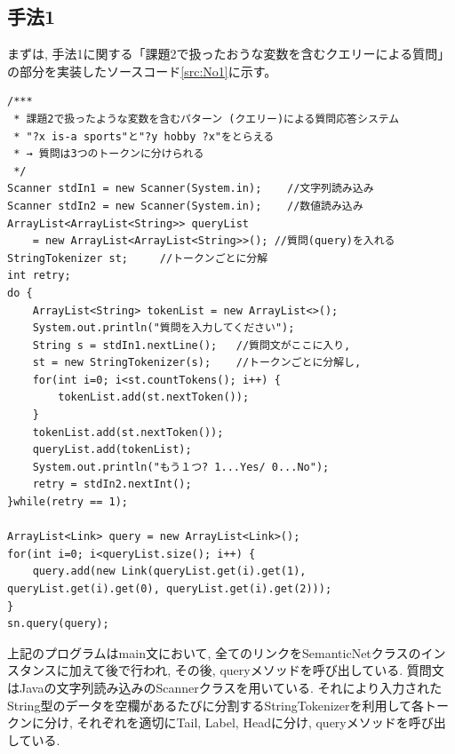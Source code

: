 \documentclass[uplatex,12pt]{jsarticle}
\begin{document}
\subsection{手法1}
まずは, 手法1に関する「課題2で扱ったおうな変数を含むクエリーによる質問」の部分を実装したソースコード\ref{src:No1}に示す。
\begin{lstlisting}[caption=クエリーの形に添った質問応答, label=src:No1]
/***
 * 課題2で扱ったような変数を含むパターン (クエリー)による質問応答システム
 * "?x is-a sports"と"?y hobby ?x"をとらえる
 * → 質問は3つのトークンに分けられる
 */
Scanner stdIn1 = new Scanner(System.in);	//文字列読み込み
Scanner stdIn2 = new Scanner(System.in);	//数値読み込み
ArrayList<ArrayList<String>> queryList 
    = new ArrayList<ArrayList<String>>(); //質問(query)を入れる
StringTokenizer st;		//トークンごとに分解
int retry;
do {
	ArrayList<String> tokenList = new ArrayList<>();
	System.out.println("質問を入力してください");
	String s = stdIn1.nextLine(); 	//質問文がここに入り,
	st = new StringTokenizer(s);	//トークンごとに分解し,
	for(int i=0; i<st.countTokens(); i++) {
		tokenList.add(st.nextToken());
	}
	tokenList.add(st.nextToken());
	queryList.add(tokenList);
	System.out.println("もう１つ? 1...Yes/ 0...No");
	retry = stdIn2.nextInt();
}while(retry == 1);

ArrayList<Link> query = new ArrayList<Link>();
for(int i=0; i<queryList.size(); i++) {
	query.add(new Link(queryList.get(i).get(1), queryList.get(i).get(0), queryList.get(i).get(2)));
}
sn.query(query);
\end{lstlisting}

上記のプログラムはmain文において, 全てのリンクをSemanticNetクラスのインスタンスに加えて後で行われ, その後, queryメソッドを呼び出している. 質問文はJavaの文字列読み込みのScannerクラスを用いている. それにより入力されたString型のデータを空欄があるたびに分割するStringTokenizerを利用して各トークンに分け, それぞれを適切にTail, Label, Headに分け, queryメソッドを呼び出している.\\
\end{document}
